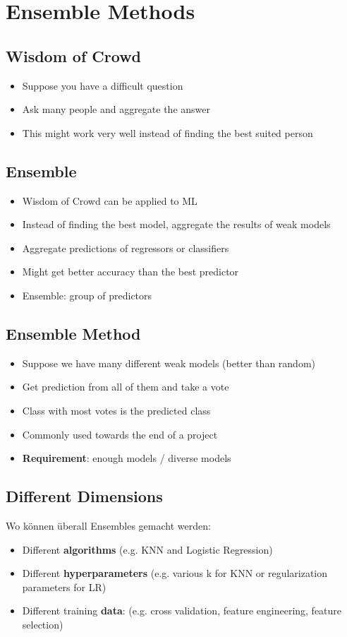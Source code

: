 \section{Ensemble Methods}
\subsection{Wisdom of Crowd}
\begin{itemize}
    \item Suppose you have a difficult question
    \item Ask many people and aggregate the answer
    \item This might work very well instead of finding the best suited person
\end{itemize}

\subsection{Ensemble}
\begin{itemize}
    \item Wisdom of Crowd can be applied to ML
    \item Instead of finding the best model, aggregate the results of weak models
    \item Aggregate predictions of regressors or classifiers
    \item Might get better accuracy than the best predictor
    \item Ensemble: group of predictors
\end{itemize}

\subsection{Ensemble Method}
\begin{itemize}
    \item Suppose we have many different weak models (better than random)
    \item Get prediction from all of them and take a vote
    \item Class with most votes is the predicted class
    \item Commonly used towards the end of a project
    \item \textbf{Requirement}: enough models / diverse models
\end{itemize}

\subsection{Different Dimensions}
Wo können überall Ensembles gemacht werden:
\begin{itemize}
    \item Different \textbf{algorithms} (e.g. KNN and Logistic Regression)
    \item Different \textbf{hyperparameters} (e.g. various k for KNN or regularization parameters for LR)
    \item Different training \textbf{data}: (e.g. cross validation, feature engineering, feature selection)
\end{itemize}

